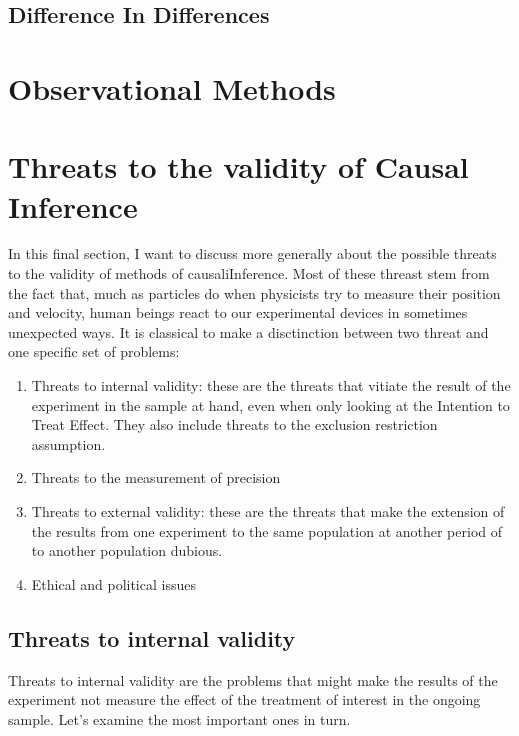 \documentclass[
]{book}
\providecommand{\tightlist}{%
  \setlength{\itemsep}{0pt}\setlength{\parskip}{0pt}}
\theoremstyle{definition}
\theoremstyle{definition}
\theoremstyle{definition}
\theoremstyle{definition}
\theoremstyle{remark}
\begin{document}
\hypertarget{difference-in-differences}{%
\section{Difference In Differences}\label{difference-in-differences}}

\hypertarget{sec:OM}{%
\chapter{Observational Methods}\label{sec:OM}}

\hypertarget{sec:threats}{%
\chapter{Threats to the validity of Causal Inference}\label{sec:threats}}

In this final section, I want to discuss more generally about the possible threats to the validity of methods of causaliInference.
Most of these threast stem from the fact that, much as particles do when physicists try to measure their position and velocity, human beings react to our experimental devices in sometimes unexpected ways.
It is classical to make a disctinction between two threat and one specific set of problems:

\begin{enumerate}
\def\labelenumi{\arabic{enumi}.}
\tightlist
\item
  Threats to internal validity: these are the threats that vitiate the result of the experiment in the sample at hand, even when only looking at the Intention to Treat Effect.
  They also include threats to the exclusion restriction assumption.
\item
  Threats to the measurement of precision
\item
  Threats to external validity: these are the threats that make the extension of the results from one experiment to the same population at another period of to another population dubious.
\item
  Ethical and political issues
\end{enumerate}

\hypertarget{threats-to-internal-validity}{%
\section{Threats to internal validity}\label{threats-to-internal-validity}}

Threats to internal validity are the problems that might make the results of the experiment not measure the effect of the treatment of interest in the ongoing sample.
Let's examine the most important ones in turn.
\end{document}
